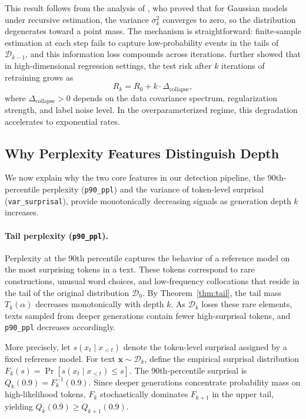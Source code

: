 This result follows from the analysis of \citet{shumailov2024collapse}, who proved that for Gaussian models under recursive estimation, the variance $\sigma_k^2$ converges to zero, so the distribution degenerates toward a point mass. The mechanism is straightforward: finite-sample estimation at each step fails to capture low-probability events in the tails of $\mathcal{D}_{k-1}$, and this information loss compounds across iterations. \citet{dohmatob2024demystified} further showed that in high-dimensional regression settings, the test risk after $k$ iterations of retraining grows as
\begin{equation}
    R_k = R_0 + k \cdot \Delta_{\text{collapse}},
    \label{eq:linear_growth}
\end{equation}
where $\Delta_{\text{collapse}} > 0$ depends on the data covariance spectrum, regularization strength, and label noise level. In the overparameterized regime, this degradation accelerates to exponential rates.

\subsection{Why Perplexity Features Distinguish Depth}
\label{sec:theory:features}

We now explain why the two core features in our detection pipeline, the 90th-percentile perplexity (\texttt{p90\_ppl}) and the variance of token-level surprisal (\texttt{var\_surprisal}), provide monotonically decreasing signals as generation depth $k$ increases.

\paragraph{Tail perplexity (\texttt{p90\_ppl}).}
Perplexity at the 90th percentile captures the behavior of a reference model on the most surprising tokens in a text. These tokens correspond to rare constructions, unusual word choices, and low-frequency collocations that reside in the tail of the original distribution $\mathcal{D}_0$. By Theorem~\ref{thm:tail}, the tail mass $T_k(\alpha)$ decreases monotonically with depth $k$. As $\mathcal{D}_k$ loses these rare elements, texts sampled from deeper generations contain fewer high-surprisal tokens, and \texttt{p90\_ppl} decreases accordingly.

More precisely, let $s(x_t \mid x_{<t})$ denote the token-level surprisal assigned by a fixed reference model. For text $\mathbf{x} \sim \mathcal{D}_k$, define the empirical surprisal distribution $F_k(s) = \Pr[s(x_t \mid x_{<t}) \leq s]$. The 90th-percentile surprisal is $Q_k(0.9) = F_k^{-1}(0.9)$. Since deeper generations concentrate probability mass on high-likelihood tokens, $F_k$ stochastically dominates $F_{k+1}$ in the upper tail, yielding $Q_k(0.9) \geq Q_{k+1}(0.9)$.

